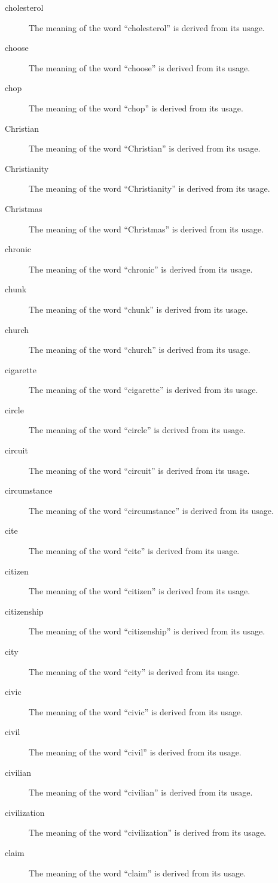 \documentclass[12pt, letterpaper]{memoir}
\begin{document}
\begin{description}
\item[cholesterol] The meaning of the word ``cholesterol'' is derived from its usage.
\item[choose] The meaning of the word ``choose'' is derived from its usage.
\item[chop] The meaning of the word ``chop'' is derived from its usage.
\item[Christian] The meaning of the word ``Christian'' is derived from its usage.
\item[Christianity] The meaning of the word ``Christianity'' is derived from its usage.
\item[Christmas] The meaning of the word ``Christmas'' is derived from its usage.
\item[chronic] The meaning of the word ``chronic'' is derived from its usage.
\item[chunk] The meaning of the word ``chunk'' is derived from its usage.
\item[church] The meaning of the word ``church'' is derived from its usage.
\item[cigarette] The meaning of the word ``cigarette'' is derived from its usage.
\item[circle] The meaning of the word ``circle'' is derived from its usage.
\item[circuit] The meaning of the word ``circuit'' is derived from its usage.
\item[circumstance] The meaning of the word ``circumstance'' is derived from its usage.
\item[cite] The meaning of the word ``cite'' is derived from its usage.
\item[citizen] The meaning of the word ``citizen'' is derived from its usage.
\item[citizenship] The meaning of the word ``citizenship'' is derived from its usage.
\item[city] The meaning of the word ``city'' is derived from its usage.
\item[civic] The meaning of the word ``civic'' is derived from its usage.
\item[civil] The meaning of the word ``civil'' is derived from its usage.
\item[civilian] The meaning of the word ``civilian'' is derived from its usage.
\item[civilization] The meaning of the word ``civilization'' is derived from its usage.
\item[claim] The meaning of the word ``claim'' is derived from its usage.

\end{description}
\end{document}
